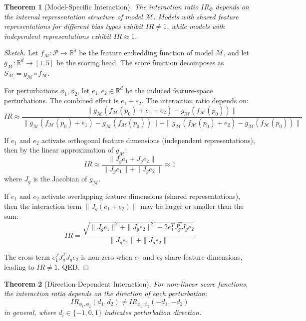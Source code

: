 \documentclass[11pt]{article}
\newtheorem{theorem}{Theorem}
\newtheorem{proof}{Proof}
\begin{document}
\begin{theorem}[Model-Specific Interaction]
The interaction ratio $IR_\Phi$ depends on the internal representation structure of model $\mathcal{M}$. Models with shared feature representations for different bias types exhibit $IR \neq 1$, while models with independent representations exhibit $IR \approx 1$.
\end{theorem}

\begin{proof}[Sketch]
Let $f_\mathcal{M}: \mathcal{P} \rightarrow \mathbb{R}^d$ be the feature embedding function of model $\mathcal{M}$, and let $g_\mathcal{M}: \mathbb{R}^d \rightarrow [1,5]$ be the scoring head. The score function decomposes as $S_\mathcal{M} = g_\mathcal{M} \circ f_\mathcal{M}$.

For perturbations $\phi_1, \phi_2$, let $e_1, e_2 \in \mathbb{R}^d$ be the induced feature-space perturbations. The combined effect is $e_1 + e_2$. The interaction ratio depends on:
\begin{equation}
IR \approx \frac{\|g_\mathcal{M}(f_\mathcal{M}(p_0) + e_1 + e_2) - g_\mathcal{M}(f_\mathcal{M}(p_0))\|}{\|g_\mathcal{M}(f_\mathcal{M}(p_0) + e_1) - g_\mathcal{M}(f_\mathcal{M}(p_0))\| + \|g_\mathcal{M}(f_\mathcal{M}(p_0) + e_2) - g_\mathcal{M}(f_\mathcal{M}(p_0))\|}
\end{equation}

If $e_1$ and $e_2$ activate orthogonal feature dimensions (independent representations), then by the linear approximation of $g_\mathcal{M}$:
\begin{equation}
IR \approx \frac{\|J_g e_1 + J_g e_2\|}{\|J_g e_1\| + \|J_g e_2\|} \approx 1
\end{equation}
where $J_g$ is the Jacobian of $g_\mathcal{M}$.

If $e_1$ and $e_2$ activate overlapping feature dimensions (shared representations), then the interaction term $\|J_g(e_1 + e_2)\|$ may be larger or smaller than the sum:
\begin{equation}
IR = \frac{\sqrt{\|J_g e_1\|^2 + \|J_g e_2\|^2 + 2 e_1^T J_g^T J_g e_2}}{\|J_g e_1\| + \|J_g e_2\|}
\end{equation}

The cross term $e_1^T J_g^T J_g e_2$ is non-zero when $e_1$ and $e_2$ share feature dimensions, leading to $IR \neq 1$. QED.
\end{proof}

\begin{theorem}[Direction-Dependent Interaction]
For non-linear score functions, the interaction ratio depends on the direction of each perturbation:
\begin{equation}
IR_{\phi_1,\phi_2}(d_1, d_2) \neq IR_{\phi_1,\phi_2}(-d_1, -d_2)
\end{equation}
in general, where $d_i \in \{-1, 0, 1\}$ indicates perturbation direction.
\end{theorem}
\end{document}
